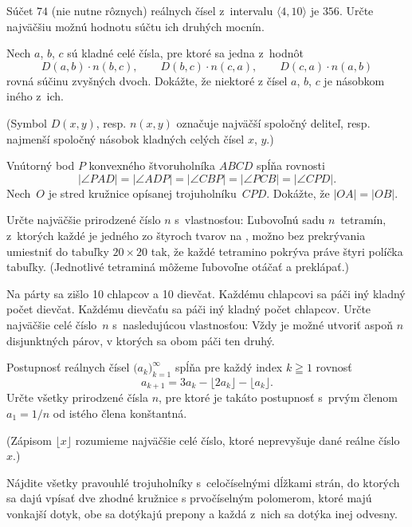 {%
Súčet $74$ (nie nutne rôznych) reálnych čísel z~intervalu $\langle4,10\rangle$ je $356$.
Určte najväčšiu možnú hodnotu súčtu ich druhých mocnín.}

{%
Nech $a$, $b$, $c$ sú kladné celé čísla, pre ktoré sa jedna z~hodnôt
$$
D(a,b)\cdot n(b,c), \qquad D(b,c)\cdot n(c,a), \qquad D(c,a)\cdot n(a,b)
$$
rovná súčinu zvyšných dvoch. Dokážte, že niektoré z čísel $a$, $b$, $c$ je násobkom
iného z~ich.

(Symbol $D(x,y)$, resp. $n(x,y)$ označuje najväčší spoločný deliteľ, resp. najmenší spoločný násobok kladných celých
čísel $x$, $y$.)}

{%
Vnútorný bod $P$ konvexného štvoruholníka $ABCD$ spĺňa rovnosti
$$
|\angle PAD|=|\angle ADP|=|\angle CBP|=|\angle PCB|=|\angle CPD|.
$$
Nech~$O$ je stred kružnice opísanej trojuholníku~$CPD$. Dokážte, že $|OA|=|OB|$.}

{%
Určte najväčšie prirodzené číslo $n$ s~vlastnosťou: Ľubovoľnú sadu $n$~tetramín, z~ktorých každé je jedného zo štyroch tvarov na \obr,
možno bez prekrývania umiestniť do tabuľky $20\times 20$ tak, že každé tetramino pokrýva práve štyri políčka tabuľky.
(Jednotlivé tetraminá môžeme ľubovoľne otáčať a preklápať.)
%
}

{%
Na párty sa zišlo 10 chlapcov a 10 dievčat. Každému chlapcovi sa páči iný kladný počet dievčat. Každému dievčaťu sa páči iný kladný počet chlapcov. Určte najväčšie celé číslo~$n$ s~nasledujúcou vlastnosťou:
Vždy je možné utvoriť aspoň $n$ disjunktných párov, v ktorých sa obom páči ten druhý.}

{%
Postupnosť reálnych čísel $\bigl(a_k\bigr)_{k=1}^{\infty}$ spĺňa pre každý index $k\geqq1$ rovnosť
$$
a_{k+1}=3a_k-\lfloor{2a_k}\rfloor-\lfloor{a_k}\rfloor.
$$
Určte všetky prirodzené čísla $n$, pre ktoré je takáto postupnosť s~prvým členom $a_1=1/n$ od istého člena konštantná.

\smallskip
(Zápisom $\lfloor{x}\rfloor$ rozumieme najväčšie celé číslo, ktoré neprevyšuje dané reálne číslo~$x$.)}

{%
Nájdite všetky pravouhlé trojuholníky s~celočíselnými dĺžkami strán, do ktorých sa dajú vpísať dve zhodné kružnice s prvočíselným polomerom,
ktoré majú vonkajší dotyk, obe sa dotýkajú prepony a každá z~nich sa dotýka inej odvesny.}

